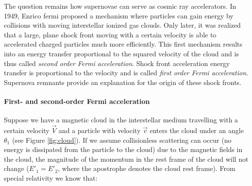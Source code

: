The question remains how supernovae can serve as cosmic ray accelerators. In 1949, Enrico fermi proposed a mechanism where particles can gain energy by collisions with moving interstellar ionized gas clouds. Only later, it was realized that a large, plane shock front moving with a certain velocity is able to accelerated charged particles much more efficiently. This first mechanism results into an energy transfer proportional to the squared velocity of the cloud and is thus called \textit{second order Fermi acceleration}. Shock front acceleration energy transfer is proportional to the velocity and is called \textit{first order Fermi acceleration}. Supernova remnants provide an explanation for the origin of these shock fronts.

\paragraph{First- and second-order Fermi acceleration}
\label{para:fermiacceleration}

Suppose we have a magnetic cloud in the interstellar medium travelling with a certain velocity $\vec{V}$ and a particle with velocity $\vec{v}$ enters the cloud under an angle $\theta_1$ (see Figure \ref{fig:cloud}). If we assume collisionless scattering can occur (no energy is dissipated from the particle to the cloud) due to the magnetic fields in the cloud, the magnitude of the momentum in the rest frame of the cloud will not change ($E'_1 = E'_2$, where the apostrophe denotes the cloud rest frame). From special relativity we know that:

